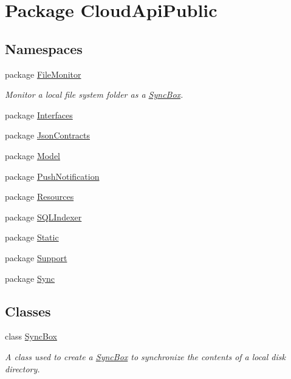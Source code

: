 \hypertarget{namespace_cloud_api_public}{\section{Package Cloud\-Api\-Public}
\label{namespace_cloud_api_public}
}
\subsection*{Namespaces}
\begin{DoxyCompactItemize}
\item 
package \hyperlink{namespace_cloud_api_public_1_1_file_monitor}{File\-Monitor}
\begin{DoxyCompactList}\small\item\em Monitor a local file system folder as a \hyperlink{class_cloud_api_public_1_1_sync_box}{Sync\-Box}. \end{DoxyCompactList}\item 
package \hyperlink{namespace_cloud_api_public_1_1_interfaces}{Interfaces}
\item 
package \hyperlink{namespace_cloud_api_public_1_1_json_contracts}{Json\-Contracts}
\item 
package \hyperlink{namespace_cloud_api_public_1_1_model}{Model}
\item 
package \hyperlink{namespace_cloud_api_public_1_1_push_notification}{Push\-Notification}
\item 
package \hyperlink{namespace_cloud_api_public_1_1_resources}{Resources}
\item 
package \hyperlink{namespace_cloud_api_public_1_1_s_q_l_indexer}{S\-Q\-L\-Indexer}
\item 
package \hyperlink{namespace_cloud_api_public_1_1_static}{Static}
\item 
package \hyperlink{namespace_cloud_api_public_1_1_support}{Support}
\item 
package \hyperlink{namespace_cloud_api_public_1_1_sync}{Sync}
\end{DoxyCompactItemize}
\subsection*{Classes}
\begin{DoxyCompactItemize}
\item 
class \hyperlink{class_cloud_api_public_1_1_sync_box}{Sync\-Box}
\begin{DoxyCompactList}\small\item\em A class used to create a \hyperlink{class_cloud_api_public_1_1_sync_box}{Sync\-Box} to synchronize the contents of a local disk directory. \end{DoxyCompactList}\end{DoxyCompactItemize}
